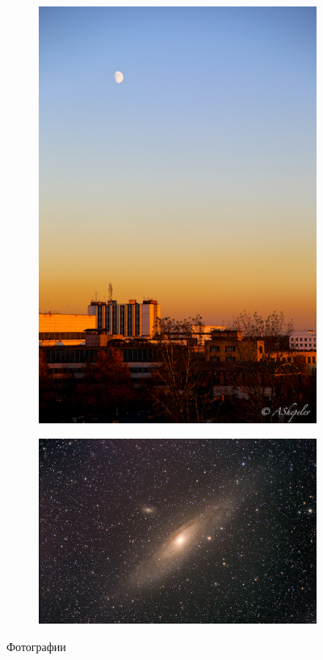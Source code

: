 \documentclass[10pt]{article}
\begin{document}
\begin{figure}
\begin{subfigure}[b]{0.3\textwidth}
					\includegraphics[width = \textwidth]{img/moon}
					\caption{}
				\end{subfigure}
				\begin{subfigure}[b]{0.3\textwidth}
					\centering
					\includegraphics[width = \textwidth]{img/galaxy}
					\caption{}
				\end{subfigure}
				\caption{Фотографии}
			\end{figure}	
			
\end{document}

